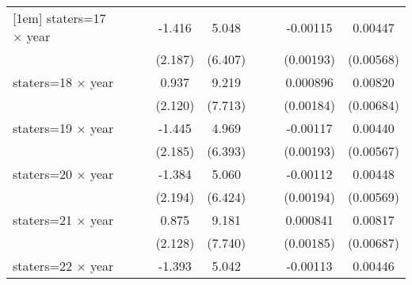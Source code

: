 {\begin{longtable}{l*{8}{c}}
[1em]
staters=17 $\times$ year&                     &                     &      -1.416         &       5.048         &                     &                     &    -0.00115         &     0.00447         \\
                    &                     &                     &     (2.187)         &     (6.407)         &                     &                     &   (0.00193)         &   (0.00568)         \\
[1em]
staters=18 $\times$ year&                     &                     &       0.937         &       9.219         &                     &                     &    0.000896         &     0.00820         \\
                    &                     &                     &     (2.120)         &     (7.713)         &                     &                     &   (0.00184)         &   (0.00684)         \\
[1em]
staters=19 $\times$ year&                     &                     &      -1.445         &       4.969         &                     &                     &    -0.00117         &     0.00440         \\
                    &                     &                     &     (2.185)         &     (6.393)         &                     &                     &   (0.00193)         &   (0.00567)         \\
[1em]
staters=20 $\times$ year&                     &                     &      -1.384         &       5.060         &                     &                     &    -0.00112         &     0.00448         \\
                    &                     &                     &     (2.194)         &     (6.424)         &                     &                     &   (0.00194)         &   (0.00569)         \\
[1em]
staters=21 $\times$ year&                     &                     &       0.875         &       9.181         &                     &                     &    0.000841         &     0.00817         \\
                    &                     &                     &     (2.128)         &     (7.740)         &                     &                     &   (0.00185)         &   (0.00687)         \\
[1em]
staters=22 $\times$ year&                     &                     &      -1.393         &       5.042         &                     &                     &    -0.00113         &     0.00446         \\

\end{longtable}}
